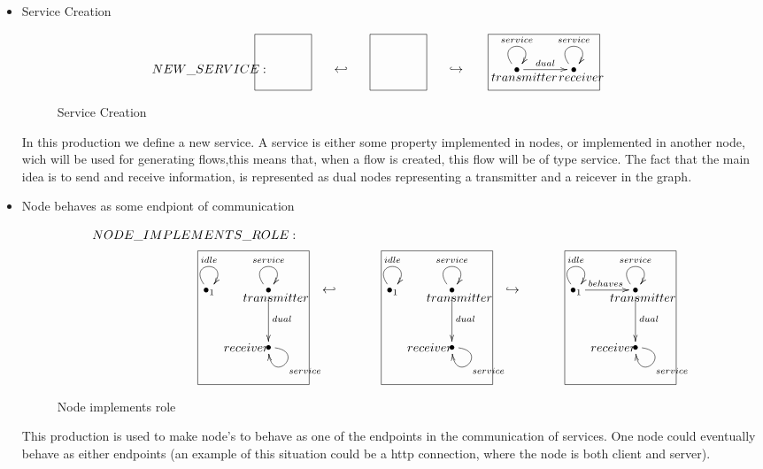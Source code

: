 \documentclass[envcountsect,runningheads]{llncs}
\begin{document}
\begin{itemize}
  \item Service Creation
  \begin{figure}[H]
    \[
       \xymatrix@C=35pt@R=16pt
       {
        {}
         \POS[]-<5pc,0pc>\drop{NEW\_SERVICE:}
         \POS[]+<0pc,.5pc> *+=<3.8pc,3.8pc>[F-]{} & {\hookleftarrow} &
         {}
         \POS[]+<0pc,.5pc> *+=<3.8pc,3.8pc>[F-]{} & {\hookrightarrow} &
         {\bullet} \ar@(ul,ur)^{service} \ar@{->}^{dual}[r] \POS[]-<-0.5pc,.5pc> \drop{transmitter} 
         &
         {\bullet} \ar@(ul,ur)^{service} \POS[]-<-0.5pc,.5pc> \drop{receiver}
         \POS[]+<-2pc,.5pc> *+=<7.5pc,3.8pc>[F-]{} &
      }
    \]
    \caption{Service Creation}
    \protect\label{fig:servicecreation}
  \end{figure}
  In this production we define a new service. A service is either some property 
  implemented in nodes, or implemented in another node, wich will be used for generating 
  flows,this means that, when a flow is created, this flow will be of type service. The fact that the
  main idea is to send and receive information, is represented as dual nodes representing a 
  transmitter and a reicever in the graph.\\
  
  \item Node behaves as some endpiont of communication
  \begin{figure}[H]
    \[
       \xymatrix@C=35pt@R=35pt
       {
         {}\POS[]-<1pc,0pc>\drop{NODE\_IMPLEMENTS\_ROLE:}
         \\
         {\bullet}_{1} \ar@(ul,ur)^{idle} &
         {\bullet} \ar@(ul,ur)^{service} \ar@{->}^{dual}[d] \POS[]-<-0.5pc,.5pc> \drop{transmitter}
         & {\hookleftarrow} &
         {\bullet}_{1} \ar@(ul,ur)^{idle} &
         {\bullet} \ar@(ul,ur)^{service} \ar@{->}^{dual}[d] \POS[]-<-0.5pc,.5pc> \drop{transmitter}
         & {\hookrightarrow} &
         {\bullet}_{1} \ar@(ul,ur)^{idle}\ar@{->}^{behaves}[r]
         &
         {\bullet} \ar@(ul,ur)^{service} \ar@{->}^{dual}[d] \POS[]-<-0.5pc,.5pc> \drop{transmitter}
         \\
         & {\bullet} \ar@(r,d)^{service} \POS[]-<1.5pc,0pc> \drop{receiver}
         \POS[]+<-1pc,2pc> *+=<7.5pc,9pc>[F-]{} & & &
         {\bullet} \ar@(r,d)^{service} \POS[]-<1.5pc,0pc> \drop{receiver}
         \POS[]+<-1pc,2pc> *+=<7.5pc,9pc>[F-]{} & & &
         {\bullet} \ar@(r,d)^{service} \POS[]-<1.5pc,0pc> \drop{receiver}
         \POS[]+<-1pc,2pc> *+=<7.5pc,9pc>[F-]{}
       }
    \]
    \caption{Node implements role}
    \protect\label{fig:attachmentnodetoservice}
  \end{figure}
  This production is used to make node's to behave as one of the endpoints in 
  the communication of services. One node could eventually behave as either 
  endpoints (an example of this situation could be a http connection, where the node is 
  both client and server).\\
  

\end{itemize}
\end{document}

